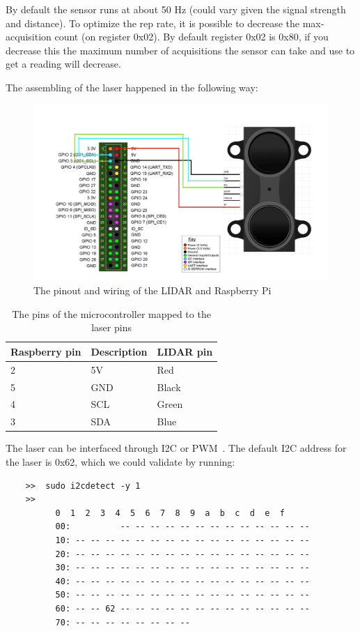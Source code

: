 By default the sensor runs at about 50 Hz (could vary given the signal strength and distance). To optimize the rep rate, it is possible to decrease the max-acquisition count (on register 0x02). By default register 0x02 is 0x80, if you decrease this the maximum number of acquisitions the sensor can take and use to get a reading will decrease\cite{reprate}.

\pagebreak
The assembling of the laser happened in the following way:

\begin{figure}[H]
	\centering
	\includegraphics[scale=.3]{images/laderraspberryconnection.png}
	\caption{The pinout and wiring of the LIDAR and Raspberry Pi}
	\label{fig:wiringlidarpi}
\end{figure}

\begin{table}[H]
	\centering
	\begin{tabular}{|l|l|l|}
		\hline
		\textbf{Raspberry pin} & \textbf{Description} & \textbf{LIDAR pin} \\ \hline
		2 & 5V & Red \\ \hline
		5 & GND & Black \\ \hline
		4 & SCL & Green \\ \hline
		3 & SDA & Blue \\ \hline
	\end{tabular}
	\caption{The pins of the microcontroller mapped to the laser pins}
\end{table}

The laser can be interfaced through I2C or PWM~\cite{lidarsum}. The default I2C address for the laser is 0x62, which we could validate by running:
\lstset{language=sh}
\begin{lstlisting}
	>>	sudo i2cdetect -y 1
	>>
		  0  1  2  3  4  5  6  7  8  9  a  b  c  d  e  f
		  00:          -- -- -- -- -- -- -- -- -- -- -- -- --
		  10: -- -- -- -- -- -- -- -- -- -- -- -- -- -- -- --
		  20: -- -- -- -- -- -- -- -- -- -- -- -- -- -- -- --
		  30: -- -- -- -- -- -- -- -- -- -- -- -- -- -- -- --
		  40: -- -- -- -- -- -- -- -- -- -- -- -- -- -- -- --
		  50: -- -- -- -- -- -- -- -- -- -- -- -- -- -- -- --
		  60: -- -- 62 -- -- -- -- -- -- -- -- -- -- -- -- --
		  70: -- -- -- -- -- -- -- -- 
\end{lstlisting}

